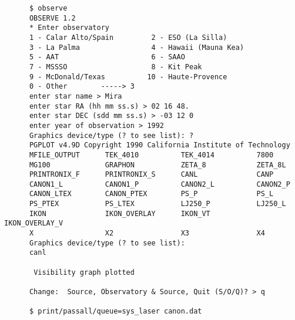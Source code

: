 \begin{small}
\begin{verbatim}
      $ observe                                                            
      OBSERVE 1.2                                                          
      * Enter observatory                                                  
      1 - Calar Alto/Spain         2 - ESO (La Silla)                      
      3 - La Palma                 4 - Hawaii (Mauna Kea)                  
      5 - AAT                      6 - SAAO                                
      7 - MSSSO                    8 - Kit Peak                            
      9 - McDonald/Texas          10 - Haute-Provence                      
      0 - Other        -----> 3                                            
      enter star name > Mira                                               
      enter star RA (hh mm ss.s) > 02 16 48.                               
      enter star DEC (sdd mm ss.s) > -03 12 0                              
      enter year of observation > 1992                                     
      Graphics device/type (? to see list): ?                              
      PGPLOT v4.9D Copyright 1990 California Institute of Technology   
      MFILE_OUTPUT      TEK_4010          TEK_4014          7800       
      MG100             GRAPHON           ZETA_8            ZETA_8L    
      PRINTRONIX_F      PRINTRONIX_S      CANL              CANP       
      CANON1_L          CANON1_P          CANON2_L          CANON2_P   
      CANON_LTEX        CANON_PTEX        PS_P              PS_L       
      PS_PTEX           PS_LTEX           LJ250_P           LJ250_L    
      IKON              IKON_OVERLAY      IKON_VT           IKON_OVERLAY_V 
      X                 X2                X3                X4             
      Graphics device/type (? to see list):                                
      canl                                                                 
                                                                           
       Visibility graph plotted                                            
                                                                           
      Change:  Source, Observatory & Source, Quit (S/O/Q)? > q             
                                                                           
      $ print/passall/queue=sys_laser canon.dat                           
\end{verbatim}                                                            
\end{small}

